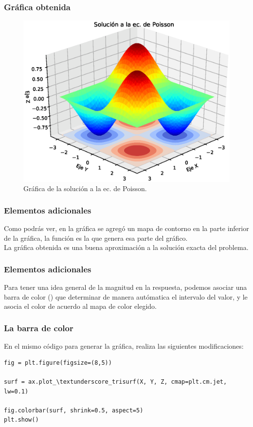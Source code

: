 {
\begin{frame}
\frametitle{Gráfica obtenida}
\begin{figure}[h!]
   \centering
   \includegraphics[scale=0.5]{Imagenes/Ejercicio_Ec_Poisson_01.eps}
   \caption{Gráfica de la solución a la ec. de Poisson.}
\end{figure}
\end{frame}
}
\begin{frame}
\frametitle{Elementos adicionales}
Como podrás ver, en la gráfica se agregó un mapa de contorno en la parte inferior de la gráfica, la función  es la que genera esa parte del gráfico.
\\
\bigskip
\pause
La gráfica obtenida es una buena aproximación a la solución exacta del problema.
\end{frame}
\begin{frame}
\frametitle{Elementos adicionales}
Para tener una idea general de la magnitud en la respuesta, podemos asociar una barra de color () que determinar de manera autómatica el intervalo del valor, y le asocia el color de acuerdo al mapa de color elegido.
\end{frame}
\begin{frame}[fragile]
\frametitle{La barra de color}
En el mismo código para generar la gráfica, realiza las siguientes modificaciones:
\begin{lstlisting}[caption=Cambios en el código de la gráfica, style=FormattedNumber, basicstyle=\linespread{1.1}\ttfamily=\small, columns=fullflexible]
fig = plt.figure(figsize=(8,5))

surf = ax.plot_\textunderscore_trisurf(X, Y, Z, cmap=plt.cm.jet, lw=0.1)

fig.colorbar(surf, shrink=0.5, aspect=5)
plt.show()
\end{lstlisting}
\end{frame}
